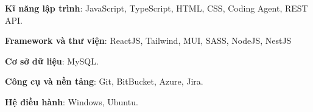 \begin{cvempty}
    \begin{cvitems}
        \item{\textbf{Kĩ năng lập trình}: JavaScript, TypeScript, HTML, CSS,  Coding Agent, REST API.}
        \item{\textbf{Framework và thư viện}: ReactJS, Tailwind, MUI, SASS, NodeJS, NestJS}
        \item{\textbf{Cơ sở dữ liệu}: MySQL.}
        \item{\textbf{Công cụ và nền tảng}: Git, BitBucket, Azure, Jira.}
        \item{\textbf{Hệ điều hành}: Windows, Ubuntu.}
    \end{cvitems}
\end{cvempty}

